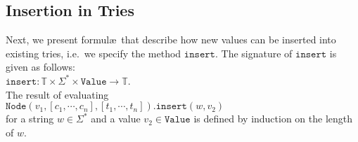 \subsection{Insertion in Tries}
Next, we present formul\ae\ that describe how new values can be inserted into existing tries,
i.e.~we specify the method $\mathtt{insert}$.  The signature of $\mathtt{insert}$ is given as follows:
\\[0.2cm]
\hspace*{1.3cm}
$\mathtt{insert}: \mathbb{T} \times \Sigma^* \times \mathtt{Value} \rightarrow \mathbb{T}$.
\\[0.2cm]
The result of evaluating \\[0.2cm]
\hspace*{1.3cm} 
$\mathtt{Node}(v_1, [c_1, \cdots, c_n], [t_1, \cdots, t_n]).\mathtt{insert}(w, v_2)$
\\[0.2cm]
for a string $w\in \Sigma^*$ and a value $v_2 \in \mathtt{Value}$ is defined by induction on the
length of $w$.
